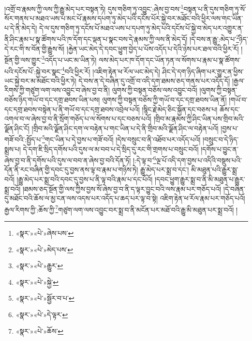 །འགྲོ་བ་རྣམས་ཀྱི་ལས་ཀྱི་རྒྱུ་མེད་པར་བསྟན་ཏེ། དུས་གཅིག་ཏུ་འབྱུང་:ཞེས་བྱ་བས་\footnote{«སྣར་»«པེ་»ཞེས་པས་}བསྟན་པ་ནི་དུས་གཅིག་ཏུ་སོ་སོར་གནས་པ་མཐའ་ཡས་པ་མང་པོ་རྣམས་དཔག་ཏུ་མེད་པའི་དངོས་པོར་སྐྱེ་བར་མཐོང་བའི་ཕྱིར་ལས་གང་ཡིན་པ་དེ་ནི་མེད་དེ། དེ་ལ་དུས་གཅིག་ཏུ་དངོས་པོ་མཐའ་ཡས་པ་དཔག་ཏུ་མེད་པའི་དངོས་པོ་སྐྱེ་བ་མེད་པར་འགྱུར་ན་ནི་ཤིང་རྣམ་པ་སྣ་ཚོགས་པའི་ཁ་དོག་དང་ལྡན་པ་སྣང་བས་དེ་རྣམས་ཀྱི་ལས་ནི་མེད་དོ། །དེ་བས་ན་རྒྱུ་:མེད་པ་\footnote{«སྣར་»«པེ་»མེད་པས་}ཉིད་དེ་རང་གི་ས་བོན་གྱི་རྒྱུས་སོ། །རྐྱེན་ཡང་མེད་དེ་དབང་ཕྱུག་བྱེད་པ་པོས་འདོད་པ་དེའི་ཉེས་པར་ཐལ་བའི་ཕྱིར་རོ། །སྔོན་གྱི་ལས་གྱུར་\footnote{«སྣར་»«པེ་»རྒྱུར་}འདོད་པ་ཡང་མ་ཡིན་ཏེ། ལས་མེད་པར་ཁ་དོག་དང་ཡོན་ཏན་ལ་སོགས་པ་རྣམ་པ་སྣ་ཚོགས་པའི་དངོས་པོ་:སྐྱེ་བར་སྣང་\footnote{«སྣར་»«པེ་»སྐྱེ་}བའི་ཕྱིར་རོ། །འཇིག་རྟེན་ཕ་རོལ་ཡང་མེད་དེ། ཤིང་དེ་དག་ཉིད་ཞིག་པར་གྱུར་ན་ཕྱིས་ཡང་སྐྱེ་བར་མ་མཐོང་བའི་ཕྱིར་ཏེ། དེ་བས་ན་དེ་བཞིན་དུ་འགྲོ་བ་འདི་དག་ཐམས་ཅད་གནས་པར་འདོད་དོ། །རྒྱལ་རིགས་ཀྱི་གཙུག་ལག་ལས་འབྱུང་བ་ཞེས་བྱ་བ་ནི། ལུགས་ཀྱི་བསྟན་བཅོས་ལས་འབྱུང་བའོ། །ལུགས་ཀྱི་བསྟན་བཅོས་ཉིད་གཡོ་བ་དང་དགྲ་ཐབས་ཡིན་པས། ལུགས་ཀྱི་བསྟན་བཅོས་ཀྱི་གཡོ་བ་དང་དགྲ་ཐབས་ཡིན་ནོ། །གཡོ་བ་དང་དགྲ་ཐབས་བསྟེན་པ་ནི་གཡོ་བ་དང་དགྲ་ཐབས་འབྲེལ་པའོ། །སྙིང་རྗེ་མེད་ཅིང་སྐྱོན་དང་བཅས་པ། ཆོས་དང་འགལ་བ་ལ་ཞེས་བྱ་བ་ནི་སྲོག་གཅོད་པ་ལ་སོགས་པ་དང་བཅས་པའོ། །གྲིབ་མ་རྣམས་ཀྱི་ཤིང་ཡིན་པས་གྲིབ་མའི་ལྗོན་ཤིང་ངོ། །གྲིབ་མའི་ལྗོན་ཤིང་དག་ལ་བརྟེན་པ་གང་ཡིན་པ་དེ་ནི་གྲིབ་མའི་ལྗོན་ཤིང་ལ་བརྟེན་པའོ། །བྱས་པ་གཟོ་བའི་:སྤྱོད་པ་\footnote{«སྣར་»«པེ་»སྦྱོར་བ་པ་}གང་ཡིན་པ་དེ་བྱས་པ་གཟོ་བའོ། །དེས་བསྲུང་བ་ནི་འཐོབ་པར་འདོད་པའོ། །བསྲུང་བ་དེ་ཉིད་སྨྲས་པ། དེ་དག་ཇི་སྲིད་དགོས་པའི་དུས་ལ་མ་བབ་པ་དེ་སྲིད་དུ་རང་གི་གྲགས་པ་བསྲུང་བའོ། །དགོས་པ་བྱུང་ན་ཞེས་བྱ་བ་ནི་དགོས་པའི་དུས་ལ་བབ་ན་ཞེས་བྱ་བའི་དོན་ཏོ། །:དེ་ལྟ་བ་\footnote{«སྣར་»«པེ་»དེ་ལྟར་}ལྔ་པོ་འདི་དག་བྱས་པ་འདིའི་བསྡུས་པའི་དོན་ནི་རང་བཞིན་གྱི་དབང་དུ་བྱས་ནས་ལྟ་བ་རྣམ་པ་གཉིས་ཏེ། རྒྱུ་མེད་པར་སྨྲ་བ་དང་། མི་མཐུན་པའི་རྒྱུར་སྨྲ་བའོ། །རྒྱུ་མེད་པར་སྨྲ་བའི་དབང་དུ་བྱས་པ་ནི་ལྟ་བའི་རྣམ་པ་དང་པོའོ། །དབང་ཕྱུག་རྒྱུར་སྨྲ་བ་ནི་མི་མཐུན་པ་རྒྱུར་སྨྲ་བའོ། །ཐམས་ཅད་སྔོན་གྱི་ལས་ཀྱིས་བྱས་སོ་ཞེས་བྱ་བ་ནི་ད་ལྟར་བྱུང་བའི་ལས་རྣམ་པར་གཅོད་པའོ། །དེ་བཞིན་དུ་མཐོང་བའི་ཆོས་ལ་མྱ་ངན་ལས་འདས་པར་འདོད་པ་ཆད་པར་ལྟ་བ་སྟེ། འཇིག་རྟེན་ཕ་རོལ་རྣམ་པར་གཅོད་པའོ། རྒྱལ་རིགས་ཀྱི་:ཆོས་ཀྱི་\footnote{«སྣར་»«པེ་»ཆོས་}གཙུག་ལག་ལས་འབྱུང་བར་སྨྲ་བ་ནི་མངོན་པར་མཐོ་བའི་རྒྱུ་མི་མཐུན་པར་སྨྲ་བའོ། །

